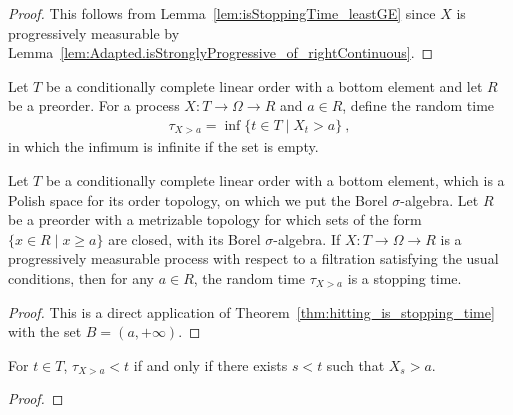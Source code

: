 \begin{proof}
This follows from Lemma~\ref{lem:isStoppingTime_leastGE} since $X$ is progressively measurable by Lemma~\ref{lem:Adapted.isStronglyProgressive_of_rightContinuous}.
\end{proof}


\begin{definition}\label{def:leastGT}
  \leanok
Let $T$ be a conditionally complete linear order with a bottom element and let $R$ be a preorder.
For a process $X : T \to Ω \to R$ and $a \in R$, define the random time
\begin{align*}
  \tau_{X > a} = \inf\{t \in T \mid X_t > a\} \: ,
\end{align*}
in which the infimum is infinite if the set is empty.
\end{definition}


\begin{lemma}\label{lem:isStoppingTime_leastGT}
  \leanok
Let $T$ be a conditionally complete linear order with a bottom element, which is a Polish space for its order topology, on which we put the Borel $\sigma$-algebra.
Let $R$ be a preorder with a metrizable topology for which sets of the form $\{x \in R \mid x \ge a\}$ are closed, with its Borel $\sigma$-algebra.
If $X : T \to Ω \to R$ is a progressively measurable process with respect to a filtration satisfying the usual conditions, then for any $a \in R$, the random time $\tau_{X > a}$ is a stopping time.
\end{lemma}

\begin{proof}\leanok
This is a direct application of Theorem~\ref{thm:hitting_is_stopping_time} with the set $B = (a, +\infty)$.
\end{proof}


\begin{lemma}\label{lem:leastGT_lt_iff}
  \leanok
For $t \in T$, $\tau_{X > a} < t$ if and only if there exists $s < t$ such that $X_s > a$.
\end{lemma}

\begin{proof}\leanok

\end{proof}
